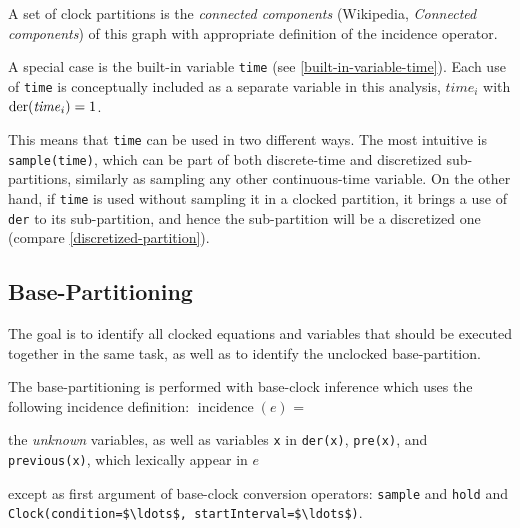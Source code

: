 A set of clock partitions is the \emph{connected components} (Wikipedia, \emph{Connected components}) of this graph with appropriate definition of the incidence operator.

A special case is the built-in variable \lstinline!time! (see \cref{built-in-variable-time}).
Each use of \lstinline!time! is conceptually included as a separate variable in this analysis, $\mathit{time}_i$ with $\text{\lstinline!der!}(\mathit{time}_{i}) = 1$.
\begin{nonnormative}
This means that  \lstinline!time! can be used in two different ways.
The most intuitive is \lstinline!sample(time)!, which can be part of both discrete-time and discretized sub-partitions, similarly as sampling any other continuous-time variable.
On the other hand, if \lstinline!time! is used without sampling it in a clocked partition, it brings a use of \lstinline!der! to its sub-partition, and hence the sub-partition will be a discretized one (compare \cref{discretized-partition}).
\end{nonnormative}

\subsection{Base-Partitioning}\label{base-clock-partitioning}

The goal is to identify all clocked equations and variables that should be executed together in the same task, as well as to identify the unclocked base-partition.

The base-partitioning is performed with base-clock inference which uses the following incidence definition:
$\operatorname{incidence}(e)$ =
\begin{list}{}{\setlength{\leftmargin}{2em}\setlength{\topsep}{-\parskip}}
\item
the \emph{unknown} variables, as well as variables \lstinline!x! in \lstinline!der(x)!, \lstinline!pre(x)!, and \lstinline!previous(x)!, which lexically appear in $e$
\begin{list}{}{\setlength{\leftmargin}{2em}\setlength{\topsep}{-\parskip}}
\item
except as first argument of base-clock conversion operators: \lstinline!sample! and \lstinline!hold! and \lstinline!Clock(condition=$\ldots$, startInterval=$\ldots$)!.
\end{list}
\end{list}\vspace{\parskip}%

